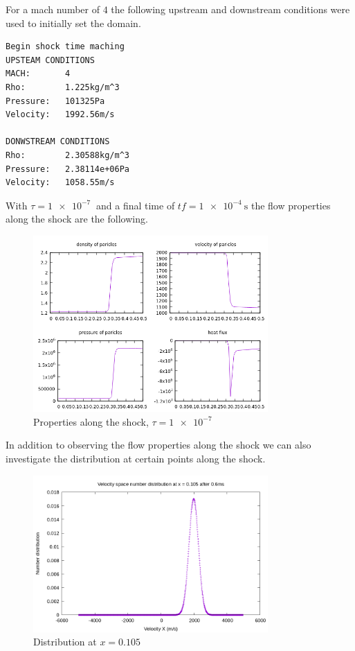 \documentclass[paper=a4, fontsize=12pt]{scrartcl}
\begin{document}
For a mach number of $4$ the following upstream and downstream conditions were used to initially set the
domain.
\begin{verbatim}
Begin shock time maching
UPSTEAM CONDITIONS
MACH:       4
Rho:        1.225kg/m^3
Pressure:   101325Pa
Velocity:   1992.56m/s

DONWSTREAM CONDITIONS
Rho:        2.30588kg/m^3
Pressure:   2.38114e+06Pa
Velocity:   1058.55m/s
\end{verbatim}
With $\tau = \SI{1e-7}{}$ and a final time of $tf = \SI{1e-4}{\second}$ the flow properties along the shock are the following.
\begin{figure}[H]
        \centering
        \includegraphics[width=0.8\textwidth]{mach-4-f}
        \caption{Properties along the shock, $\tau = \SI{1e-7}{}$ }
        \label{fig:mach-4-f}
\end{figure}
In addition to observing the flow properties along the shock we can also investigate the distribution
at certain points along the shock.
\begin{figure}[H]
        \centering
        \includegraphics[width=0.8\textwidth]{left_f-m_4}
        \caption{Distribution at $x=0.105$ }
        \label{fig:left_f-m_4}
\end{figure}
\end{document}
